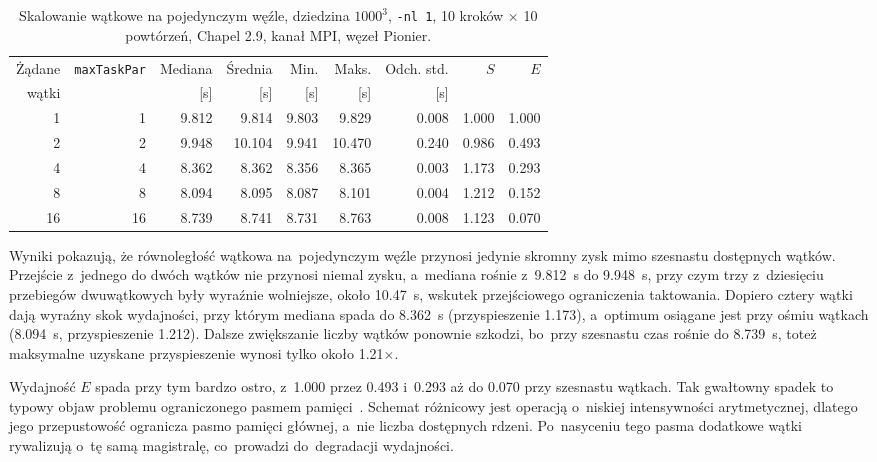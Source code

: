 \begin{table}[htbp]
\centering
\caption{Skalowanie wątkowe na pojedynczym węźle, dziedzina $1000^3$,
\texttt{-nl 1}, \num{10} kroków $\times$ \num{10} powtórzeń, Chapel 2.9,
kanał MPI, węzeł Pionier.}
\label{tab:threads-1000}
\small
\setlength{\tabcolsep}{5pt}
\begin{tabular}{rrrrrrrrr}
\toprule
Żądane & \texttt{maxTaskPar} & Mediana & Średnia & Min. & Maks. & Odch. std. & $S$ & $E$ \\
wątki & & [s] & [s] & [s] & [s] & [s] & & \\
\midrule
\num{1}  & \num{1}  & \num{9.812} & \num{9.814} & \num{9.803} & \num{9.829} & \num{0.008} & \num{1.000} & \num{1.000} \\
\num{2}  & \num{2}  & \num{9.948} & \num{10.104} & \num{9.941} & \num{10.470} & \num{0.240} & \num{0.986} & \num{0.493} \\
\num{4}  & \num{4}  & \num{8.362} & \num{8.362} & \num{8.356} & \num{8.365} & \num{0.003} & \num{1.173} & \num{0.293} \\
\num{8}  & \num{8}  & \num{8.094} & \num{8.095} & \num{8.087} & \num{8.101} & \num{0.004} & \num{1.212} & \num{0.152} \\
\num{16} & \num{16} & \num{8.739} & \num{8.741} & \num{8.731} & \num{8.763} & \num{0.008} & \num{1.123} & \num{0.070} \\
\bottomrule
\end{tabular}
\end{table}

Wyniki pokazują, że równoległość wątkowa na~pojedynczym węźle przynosi jedynie
skromny zysk mimo szesnastu dostępnych wątków. Przejście z~jednego do
dwóch wątków nie przynosi niemal zysku, a~mediana rośnie z~\SI{9.812}{\second} do
\SI{9.948}{\second}, przy czym trzy z~dziesięciu przebiegów dwuwątkowych były wyraźnie
wolniejsze, około \SI{10.47}{\second}, wskutek przejściowego ograniczenia taktowania.
Dopiero cztery wątki dają wyraźny skok wydajności, przy którym mediana spada do
\SI{8.362}{\second} (przyspieszenie \num{1.173}), a~optimum osiągane jest przy
ośmiu wątkach (\SI{8.094}{\second}, przyspieszenie \num{1.212}). Dalsze zwiększanie
liczby wątków ponownie szkodzi, bo~przy szesnastu czas rośnie do
\SI{8.739}{\second}, toteż maksymalne uzyskane przyspieszenie wynosi tylko około
\num{1.21}$\times$.

Wydajność $E$ spada przy tym bardzo ostro, z~\num{1.000}
przez \num{0.493} i~\num{0.293} aż do \num{0.070} przy szesnastu wątkach. Tak
gwałtowny spadek to typowy objaw problemu
ograniczonego pasmem pamięci~\cite{datta-stencil}. Schemat różnicowy jest operacją o~niskiej intensywności arytmetycznej, dlatego jego
przepustowość ogranicza pasmo pamięci głównej, a~nie liczba dostępnych rdzeni.
Po~nasyceniu tego pasma dodatkowe wątki rywalizują o~tę samą magistralę, co~prowadzi
do~degradacji wydajności.

